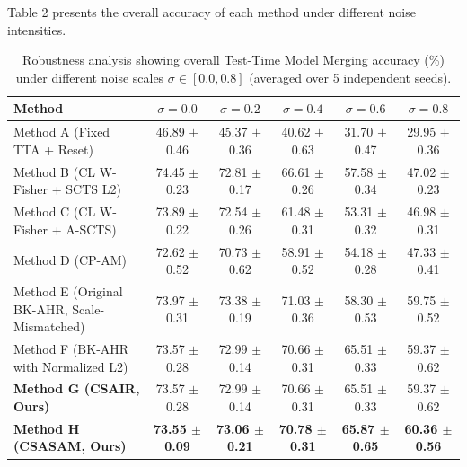 \documentclass{article}
\theoremstyle{plain}
\theoremstyle{definition}
\theoremstyle{remark}
\begin{document}
Table 2 presents the overall accuracy of each method under different noise intensities.

\begin{table}[t]
\caption{Robustness analysis showing overall Test-Time Model Merging accuracy (\%) under different noise scales $\sigma \in [0.0, 0.8]$ (averaged over 5 independent seeds).}
\label{tab:noise_sweep}
\begin{center}
\begin{scriptsize}
\begin{sc}
\setlength{\tabcolsep}{3pt}
\begin{tabular}{lccccc}
\toprule
Method & $\sigma = 0.0$ & $\sigma = 0.2$ & $\sigma = 0.4$ & $\sigma = 0.6$ & $\sigma = 0.8$ \\
\midrule
Method A (Fixed TTA + Reset)                  & 46.89 $\pm$ 0.46 & 45.37 $\pm$ 0.36 & 40.62 $\pm$ 0.63 & 31.70 $\pm$ 0.47 & 29.95 $\pm$ 0.36 \\
Method B (CL W-Fisher + SCTS L2)              & 74.45 $\pm$ 0.23 & 72.81 $\pm$ 0.17 & 66.61 $\pm$ 0.26 & 57.58 $\pm$ 0.34 & 47.02 $\pm$ 0.23 \\
Method C (CL W-Fisher + A-SCTS)              & 73.89 $\pm$ 0.22 & 72.54 $\pm$ 0.26 & 61.48 $\pm$ 0.31 & 53.31 $\pm$ 0.32 & 46.98 $\pm$ 0.31 \\
Method D (CP-AM)                             & 72.62 $\pm$ 0.52 & 70.73 $\pm$ 0.62 & 58.91 $\pm$ 0.52 & 54.18 $\pm$ 0.28 & 47.33 $\pm$ 0.41 \\
Method E (Original BK-AHR, Scale-Mismatched) & 73.97 $\pm$ 0.31 & 73.38 $\pm$ 0.19 & 71.03 $\pm$ 0.36 & 58.30 $\pm$ 0.53 & 59.75 $\pm$ 0.52 \\
Method F (BK-AHR with Normalized L2)         & 73.57 $\pm$ 0.28 & 72.99 $\pm$ 0.14 & 70.66 $\pm$ 0.31 & 65.51 $\pm$ 0.33 & 59.37 $\pm$ 0.62 \\
\textbf{Method G (CSAIR, Ours)}              & 73.57 $\pm$ 0.28 & 72.99 $\pm$ 0.14 & 70.66 $\pm$ 0.31 & 65.51 $\pm$ 0.33 & 59.37 $\pm$ 0.62 \\
\textbf{Method H (CSASAM, Ours)}             & \textbf{73.55 $\pm$ 0.09} & \textbf{73.06 $\pm$ 0.21} & \textbf{70.78 $\pm$ 0.31} & \textbf{65.87 $\pm$ 0.65} & \textbf{60.36 $\pm$ 0.56} \\
\bottomrule
\end{tabular}
\end{sc}
\end{scriptsize}
\end{center}
\end{table}
\end{document}
